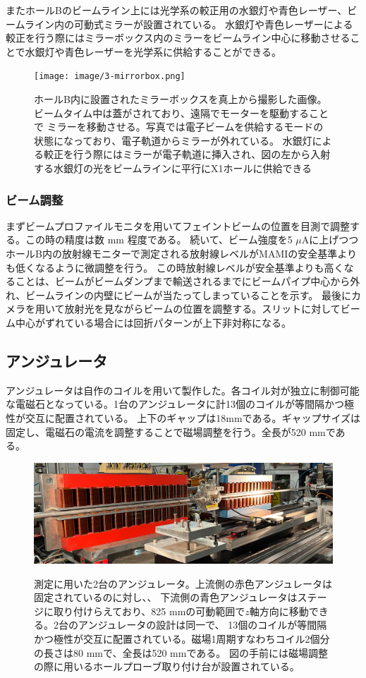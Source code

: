 \documentclass[a4paper,11pt,uplatex]{jsbook}
\begin{document}
またホールBのビームライン上には光学系の較正用の水銀灯や青色レーザー、ビームライン内の可動式ミラーが設置されている。
水銀灯や青色レーザーによる較正を行う際にはミラーボックス内のミラーをビームライン中心に移動させることで水銀灯や青色レーザーを光学系に供給することができる。
\begin{figure}
  \centering
  \texttt{[image: image/3-mirrorbox.png]}\\
  \caption[ミラーボックスの写真]{ホールB内に設置されたミラーボックスを真上から撮影した画像。ビームタイム中は蓋がされており、遠隔でモーターを駆動することで
  ミラーを移動させる。写真では電子ビームを供給するモードの状態になっており、電子軌道からミラーが外れている。
  水銀灯による較正を行う際にはミラーが電子軌道に挿入され、図の左から入射する水銀灯の光をビームラインに平行にX1ホールに供給できる}
  \label{mirrorbox}
\end{figure}
\subsubsection{ビーム調整}
まずビームプロファイルモニタを用いてフェイントビームの位置を目測で調整する。この時の精度は数 mm 程度である。
続いて、ビーム強度を5 $\si{\mu}\text{A}$に上げつつホールB内の放射線モニターで測定される放射線レベルがMAMIの安全基準よりも低くなるように微調整を行う。
この時放射線レベルが安全基準よりも高くなることは、ビームがビームダンプまで輸送されるまでにビームパイプ中心から外れ、ビームラインの内壁にビームが当たってしまっていることを示す。
最後にカメラを用いて放射光を見ながらビームの位置を調整する。スリットに対してビーム中心がずれている場合には回折パターンが上下非対称になる。

\subsection{アンジュレータ}
アンジュレータは自作のコイルを用いて製作した。各コイル対が独立に制御可能な電磁石となっている。1台のアンジュレータに計13個のコイルが等間隔かつ極性が交互に配置されている。
上下のギャップは18mmである。ギャップサイズは固定し、電磁石の電流を調整することで磁場調整を行う。全長が520 mmである。
\begin{figure}
  \centering
  \includegraphics[width=0.8\linewidth]{image/3-undulator.png}\\
  \caption[アンジュレータ]{測定に用いた2台のアンジュレータ。上流側の赤色アンジュレータは固定されているのに対し、、
  下流側の青色アンジュレータはステージに取り付けらえており、825 mmの可動範囲で$z$軸方向に移動できる。2台のアンジュレータの設計は同一で、
  13個のコイルが等間隔かつ極性が交互に配置されている。磁場1周期すなわちコイル2個分の長さは80 mmで、全長は520 mmである。
  図の手前には磁場調整の際に用いるホールプローブ取り付け台が設置されている。} 
  \label{undulator}
\end{figure}
\end{document}
